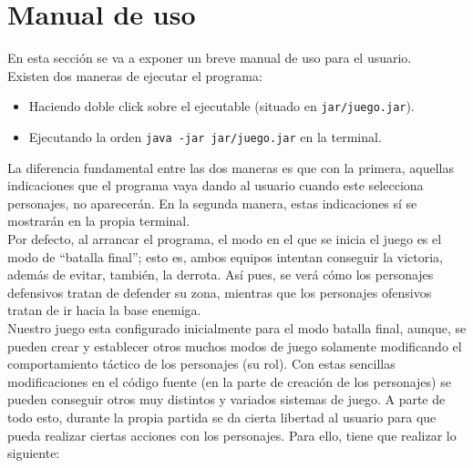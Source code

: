 \medskip
\section{Manual de uso}
En esta sección se va a exponer un breve manual de uso para el usuario. \\

Existen dos maneras de ejecutar el programa:
\begin{itemize}
 \item Haciendo doble click sobre el ejecutable (situado en \texttt{jar/juego.jar}).
 \item Ejecutando la orden \texttt{java -jar jar/juego.jar} en la terminal. 
\end{itemize}

La diferencia fundamental entre las dos maneras es que con la primera, aquellas indicaciones que el programa vaya dando al usuario cuando este selecciona personajes, no aparecerán. En la segunda manera, estas indicaciones sí se mostrarán en la propia terminal. \\

Por defecto, al arrancar el programa, el modo en el que se inicia el juego es el modo de ``batalla final''; esto es, ambos equipos intentan conseguir la victoria, además de evitar, también, la derrota. Así pues, se verá cómo los personajes defensivos tratan de defender su zona, mientras que los personajes ofensivos tratan de ir hacia la base enemiga. \\

Nuestro juego esta configurado inicialmente para el modo batalla final, aunque, se pueden crear y establecer otros muchos modos de juego solamente modificando el comportamiento táctico de los personajes (su rol). Con estas sencillas modificaciones en el código fuente (en la parte de creación de los personajes) se pueden conseguir otros muy distintos y variados sistemas de juego. A parte de todo esto, durante la propia partida se da cierta libertad al usuario para que pueda realizar ciertas acciones con los personajes. Para ello, tiene que realizar lo siguiente:


